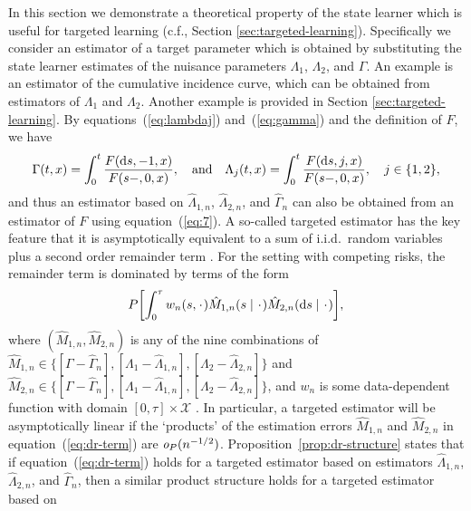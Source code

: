 In this section we demonstrate a theoretical property of the state
learner which is useful for targeted learning (c.f., Section
\ref{sec:targeted-learning}). Specifically we consider an estimator of
a target parameter which is obtained by substituting the state learner
estimates of the nuisance parameters $\Lambda_1$, $\Lambda_2$, and
$\Gamma$. An example is an estimator of the cumulative incidence
curve, which can be obtained from estimators of $\Lambda_1$ and
$\Lambda_2$. Another example is provided in Section \ref{sec:targeted-learning}.
By equations~(\ref{eq:lambdaj}) and~(\ref{eq:gamma}) and the definition of
\( F \), we have
\begin{equation}
  \label{eq:7}
  \Gamma(t , x) 
  = \int_0^t  \frac{F(\mathop{}\!\mathrm{d} s, -1, x )}{F(s-, 0, x )},
  \quad \text{and} \quad
  \Lambda_j(t , x) 
  = \int_0^t  \frac{F(\mathop{}\!\mathrm{d} s, j, x )}{F(s-, 0, x )},
  \quad j \in \{1,2\},
\end{equation}
and thus an estimator based on \( \hat{\Lambda}_{1,n} \),
\( \hat{\Lambda}_{2,n} \), and \( \hat{\Gamma}_{n} \) can also be obtained from
an estimator of $F$ using equation~(\ref{eq:7}). A so-called targeted estimator
has the key feature that it is asymptotically equivalent to a sum of i.i.d.\
random variables plus a second order remainder term
\citep{van2011targeted,hines2022demystifying}. For the setting with competing
risks, the remainder term is dominated by terms of the form
\begin{equation}
  \label{eq:dr-term}
  P{\left[
      \int_0^{\tau} w_n(s, \blank)
      \hat{M}_{1,n}(s \mid  \blank)
      \hat{M}_{2,n}(\diff s \mid  \blank)
    \right]},
\end{equation}
where \( (\hat{M}_{1,n}, \hat{M}_{2,n}) \) is any of the nine combinations of
\( \hat{M}_{1,n} \in \{[\Gamma -\hat{\Gamma}_n], [\Lambda_1
-\hat{\Lambda}_{1,n}], [\Lambda_2 -\hat{\Lambda}_{2,n}]\} \) and
\( \hat{M}_{2,n} \in \{[\Gamma -\hat{\Gamma}_n], [\Lambda_1
-\hat{\Lambda}_{1,n}], [\Lambda_2 -\hat{\Lambda}_{2,n}]\} \), and \( w_n \) is
some data-dependent function with domain \([0,\tau]\times\mathcal X \)
\citep{van2003unified}. In particular, a targeted estimator will be
asymptotically linear if the `products' of the estimation errors
\( \hat{M}_{1,n} \) and \( \hat{M}_{2,n} \) in equation~(\ref{eq:dr-term}) are
\( \textit{o}_P{(n^{-1/2})}\). Proposition~\ref{prop:dr-structure} states that if
equation~(\ref{eq:dr-term}) holds for a targeted estimator based on estimators
$\hat{\Lambda}_{1,n}$, $\hat{\Lambda}_{2,n}$, and $\hat{\Gamma}_{n}$, then a
similar product structure holds for a targeted estimator based on
